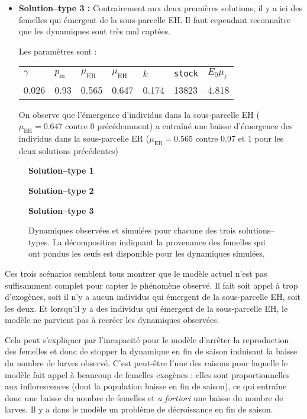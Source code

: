 \begin{itemize}
\item \textbf{Solution--type 3 :}
Contrairement aux deux premières solutions, il y a ici des femelles qui émergent de la sous-parcelle EH.
Il faut cependant reconnaître que les dynamiques sont très mal captées.

Les paramètres sont :
 \begin{center}
\begin{tabular}{lllllll}
$\gamma$ & $p_{\text{m}}$ & $\mu_{\text{ER}}$ & $\mu_{\text{EH}}$ & $k$ & \texttt{stock} & $E_0\mu_{\ell}$\\
0.026 & 0.93 & 0.565 & 0.647 & 0.174 & 13823 & 4.818
 \end{tabular}
 \end{center}
On observe que l'émergence d'individus dans la sous-parcelle EH ($\mu_{\text{EH}} = 0.647$ contre 0 précédemment) a entraîné une baisse d'émergence des individus dans la sous-parcelle ER ($\mu_{\text{ER}} = 0.565$ contre 0.97 et 1 pour les deux solutions précédentes)
 
\end{itemize}



\begin{figure}[ht]
 \centering
 \textbf{Solution--type 1}
 
 
 \textbf{Solution--type 2}
 
 
 \textbf{Solution--type 3}
 
 \caption{Dynamiques observées et simulées pour chacune des trois solutions--types. La décomposition indiquant la provenance des femelles qui ont pondus les œufs est disponible pour les dynamiques simulées.}
 \label{fig:A1}
\end{figure}

Ces trois scénarios semblent tous montrer que le modèle actuel n'est pas suffisamment complet pour capter le phénomène observé.
Il fait soit appel à trop d'exogènes, soit il n'y a aucun individus qui émergent de la sous-parcelle EH, soit les deux.
Et lorsqu'il y a des individus qui émergent de la sous-parcelle EH, le modèle ne parvient pas à recréer les dynamiques observées.

Cela peut s'expliquer par l'incapacité pour le modèle d'arrêter la reproduction des femelles et donc de stopper la dynamique en fin de saison induisant la baisse du nombre de larves observé.
C'est peut-être l'une des raisons pour laquelle le modèle fait appel  à beaucoup de femelles exogènes : elles sont proportionnelles aux inflorescences (dont la population baisse en fin de saison), ce qui entraîne donc une baisse du nombre de femelles et \emph{a fortiori} une baisse du nombre de larves.
Il y a dans le modèle un problème de décroissance en fin de saison.

